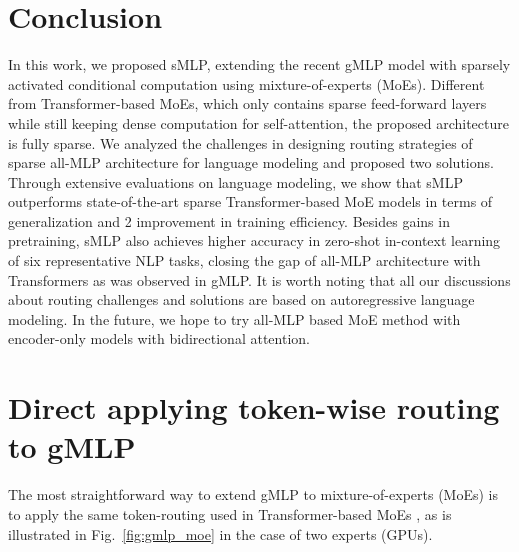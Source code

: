 \documentclass{article}
\begin{document}
 \section{Conclusion}
\label{sec:conclusion}

In this work, we proposed sMLP, extending the recent gMLP \citep{gmlp} model with sparsely activated conditional computation using mixture-of-experts (MoEs). Different from Transformer-based MoEs, which only contains sparse feed-forward layers while still keeping dense computation for self-attention, the proposed architecture is fully sparse. We analyzed the challenges in designing routing strategies of sparse all-MLP architecture for language modeling and proposed two solutions. Through extensive evaluations on language modeling, we show that sMLP outperforms state-of-the-art sparse Transformer-based MoE models in terms of generalization and 2 improvement in training efficiency. Besides gains in pretraining, sMLP also achieves higher accuracy in zero-shot in-context learning of six representative NLP tasks, closing the gap of all-MLP architecture with Transformers as was observed in gMLP.   
It is worth noting that all our discussions about routing challenges and solutions are based on autoregressive language modeling. In the future, we hope to try all-MLP based MoE method with encoder-only models with bidirectional attention.













 

\nocite{langley00}







\newpage

\appendix
\section{Direct applying token-wise routing to gMLP}
\label{sec:challenges}

The most straightforward way to extend gMLP \citep{gmlp} to mixture-of-experts (MoEs) is to apply the same token-routing used in Transformer-based MoEs \citep{gshard,switch,baselayer,hashlayer}, as is illustrated in Fig.~\ref{fig:gmlp_moe} in the case of two experts (GPUs). 
\end{document}
